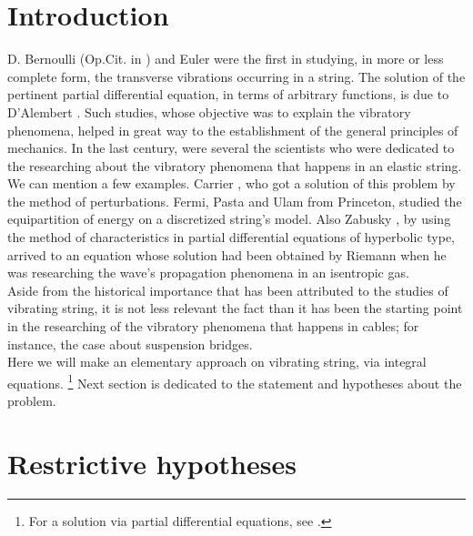 \documentclass[12pt]{article}
\begin{document}
\section{Introduction}

D. Bernoulli (Op.Cit. in \cite{cite:Truesdell}) and Euler \cite{cite:Euler} were the first in studying, in more or less complete form, the transverse vibrations occurring in a string. The solution of the pertinent partial differential equation, in terms of arbitrary functions, is due to {\small{D}}'Alembert \cite{cite:D'Alembert}. Such studies, whose objective was to explain the vibratory phenomena, helped in great way to the establishment of the general principles of mechanics. In the last century,  were several the scientists who were dedicated to the researching about the vibratory phenomena that happens in an elastic string.  We can  mention a  few examples. Carrier \cite{cite:Carrier}, who got a solution of this problem by the method of perturbations. Fermi, Pasta and Ulam \cite{cite:Fermi}  from Princeton, studied the equipartition of energy on a discretized string's model. Also Zabusky \cite{cite:Zabusky}, by using the method of characteristics in partial differential equations of hyperbolic type, arrived to an equation whose solution had been obtained by Riemann \cite{cite:Riemann}  when he was researching the wave's propagation phenomena in an isentropic gas. \\ 

Aside from the historical importance that has been attributed to the studies of vibrating string, it is not less relevant the fact than it has been the starting point in the researching of the vibratory phenomena that happens in cables; for instance, the case about  suspension bridges. \\

Here we will make an elementary approach on vibrating string, via integral equations. {\footnote{For a solution via partial differential equations, see .}}
Next section is dedicated to the statement and hypotheses about the problem.

\section{Restrictive hypotheses} 
\end{document}
